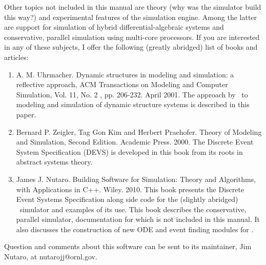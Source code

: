 Other topics not included in this manual are theory (why was the simulator build this way?) and experimental features of the simulation engine. Among the latter are support for simulation of hybrid differential-algebraic systems and conservative, parallel simulation using multi-core processors. If you are interested in any of these subjects, I offer the following (greatly abridged) list of books and articles:
\begin{enumerate}
\item A. M. Uhrmacher. Dynamic structures in modeling and simulation: a reflective approach, ACM Transactions on Modeling and Computer Simulation, Vol. 11, No. 2 , pp. 206-232. April 2001. The approach by \adevs\ to modeling and simulation of dynamic structure systems is described in this paper.
\item Bernard P. Zeigler, Tag Gon Kim and Herbert Praehofer. Theory of Modeling and Simulation, Second Edition. Academic Press. 2000. The Discrete Event System Specification (DEVS) is developed in this book from its roots in abstract systems theory.
\item James J. Nutaro. Building Software for Simulation: Theory and Algorithms, with Applications in C++. Wiley. 2010. This book presents the Discrete Event Systems Specification along side code for the (slightly abridged) \adevs\ simulator and examples of its use. This book describes the conservative, parallel simulator, documentation for which is not included in this manual. It also discusses the construction of new ODE and event finding modules for \adevs.
\end{enumerate}
Question and comments about this software can be sent to its maintainer, Jim Nutaro, at nutarojj@ornl.gov. 

